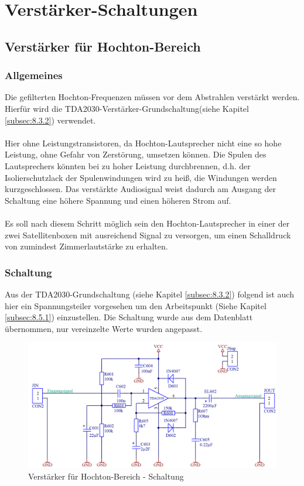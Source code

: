 
\section{Verstärker-Schaltungen}


\subsection{Verstärker für Hochton-Bereich}\label{subsec:5.1}
\subsubsection{Allgemeines}\label{subsec:5.1.1}
Die gefilterten Hochton-Frequenzen müssen vor dem Abstrahlen verstärkt werden.
Hierfür wird die TDA2030-Verstärker-Grundschaltung(siehe Kapitel \ref{subsec:8.3.2}) verwendet.
\\ \\
Hier ohne Leistungstransistoren, da Hochton-Lautsprecher nicht eine so hohe Leistung, ohne Gefahr von Zerstörung, umsetzen können.
Die Spulen des Lautsprechers könnten bei zu hoher Leistung durchbrennen, d.h. der Isolierschutzlack der Spulenwindungen wird zu heiß, die Windungen werden kurzgeschlossen.
Das verstärkte Audiosignal weist dadurch am Ausgang der Schaltung eine höhere Spannung und einen höheren Strom auf.
\\ \\
Es soll nach diesem Schritt möglich sein den Hochton-Lautsprecher in einer der zwei Satellitenboxen mit ausreichend Signal zu versorgen, um einen Schalldruck von zumindest Zimmerlautstärke zu erhalten. 

\newpage
\subsubsection{Schaltung}\label{subsec:5.1.2}
Aus der TDA2030-Grundschaltung (siehe Kapitel \ref{subsec:8.3.2}) folgend ist auch hier ein Spannungsteiler vorgesehen um den Arbeitspunkt (Siehe Kapitel \ref{subsec:8.5.1}) einzustellen.
Die Schaltung wurde aus dem Datenblatt übernommen, nur vereinzelte Werte wurden angepasst. 

\begin{figure} [H]
	\centering	
	\includegraphics[width=1\textwidth]{img/Print6/HTVerstaerker-Schem.PNG}
	\caption{Verstärker für Hochton-Bereich - Schaltung}
	\label {fig:5.1.2.1}
\end{figure}

